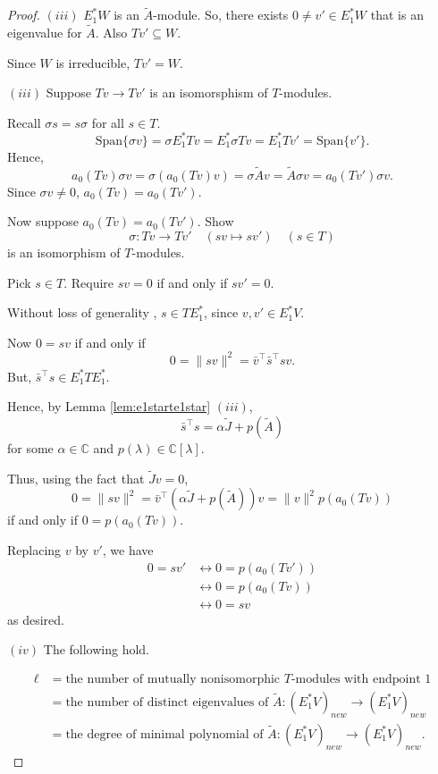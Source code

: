 \documentclass[
]{book}
\theoremstyle{definition}
\theoremstyle{definition}
\theoremstyle{definition}
\theoremstyle{definition}
\theoremstyle{remark}
\begin{document}
\begin{proof}
\((iii)\) \(E^*_1W\) is an \(\tilde{A}\)-module. So, there exists \(0\neq v'\in E^*_1W\) that is an eigenvalue for \(\tilde{A}\). Also \(Tv' \subseteq W\).

Since \(W\) is irreducible, \(Tv' = W\).

\((iii)\) Suppose \(Tv \to Tv'\) is an isomorsphism of \(T\)-modules.

Recall \(\sigma s = s\sigma\) for all \(s\in T\).
\[\mathrm{Span}\{\sigma v\} = \sigma E^*_1Tv = E^*_1\sigma Tv = E^*_1Tv' = \mathrm{Span}\{v'\}.\]
Hence,
\[a_0(Tv)\sigma v = \sigma(a_0(Tv)v) = \sigma \tilde{A}v = \tilde{A}\sigma v = a_0(Tv')\sigma v.\]
Since \(\sigma v \neq 0\), \(a_0(Tv) = a_0(Tv')\).

Now suppose \(a_0(Tv)=a_0(Tv')\). Show
\[\sigma: Tv \to Tv' \quad (sv \mapsto sv') \quad (s\in T)\]
is an isomorphism of \(T\)-modules.

Pick \(s\in T\). Require
\(sv = 0\) if and only if \(sv' = 0\).

Without loss of generality , \(s\in TE^*_1\), since \(v, v'\in E^*_1V\).

Now \(0 = sv\) if and only if
\[0 = \|sv\|^2 = \bar{v}^\top \bar{s}^\top sv.\]
But, \(\bar{s}^\top s\in E^*_1TE^*_1\).

Hence, by Lemma \ref{lem:e1starte1star} \((iii)\),
\[\bar{s}^\top s = \alpha \tilde{J} + p(\tilde{A})\]
for some \(\alpha\in \mathbb{C}\) and \(p(\lambda)\in \mathbb{C}[\lambda]\).

Thus, using the fact that \(\tilde{J}v = 0\),
\[0 = \|sv\|^2 = \bar{v}^\top (\alpha\tilde{J}+p(\tilde{A}))v = \|v\|^2 p(a_0(Tv))\]
if and only if \(0 = p(a_0(Tv))\).

Replacing \(v\) by \(v'\), we have
\begin{align}
0 = sv' & \leftrightarrow 0 = p(a_0(Tv'))\\
& \leftrightarrow 0 = p(a_0(Tv))\\
& \leftrightarrow 0 = sv
\end{align}
as desired.

\((iv)\) The following hold.

\begin{align}
\ell & = \text{the number of mutually nonisomorphic $T$-modules with endpoint $1$}\\
& = \text{the number of distinct eigenvalues of $\tilde{A}:(E^*_1V)_{new}\to (E^*_1V)_{new}$}\\
& = \text{the degree of minimal polynomial of $\tilde{A}:(E^*_1V)_{new}\to (E^*_1V)_{new}$.}
\end{align}


\end{proof}
\end{document}
